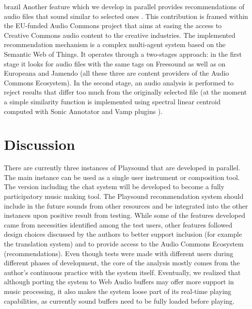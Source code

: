 \begin{otherlanguage*}{brazil}
Another feature which we develop in parallel provides recommendations of audio files that sound similar to selected ones \cite{Viola2018}. This contribution is framed within the EU-funded Audio Commons project that aims at easing the access to Creative Commons audio content to the creative industries. The implemented recommendation mechanism is a complex multi-agent system based on the Semantic Web of Things. It operates through a two-stages approach: in the first stage it looks for audio files with the same tags on Freesound as well as on Europeana and Jamendo (all these three are content providers of the Audio Commons Ecosystem). In the second stage, an audio analysis is performed to reject results that differ too much from the originally selected file (at the moment a simple similarity function is implemented using spectral linear centroid computed with Sonic Annotator and Vamp plugins \cite{Cannam2010}).

\section{Discussion}

There are currently three instances of Playsound that are developed in parallel. The main instance can be used as a single user instrument or composition tool. The version including the chat system will be developed to become a fully participatory music making tool. The Playsound recommendation system should include in the future sounds from other resources and be integrated into the other instances upon positive result from testing. While some of the features developed came from necessities identified among the test users, other features followed design choices discussed by the authors to better support inclusion (for example the translation system) and to provide access to the Audio Commons Ecosystem (recommendations). Even though tests were made with different users during different phases of development, the core of the analysis mostly comes from the author's continuous practice with the system itself. Eventually, we realized that although porting the system to Web Audio buffers may offer more support in music processing, it also makes the system loose part of its real-time playing capabilities, as currently sound buffers need to be fully loaded before playing.








\end{otherlanguage*}
